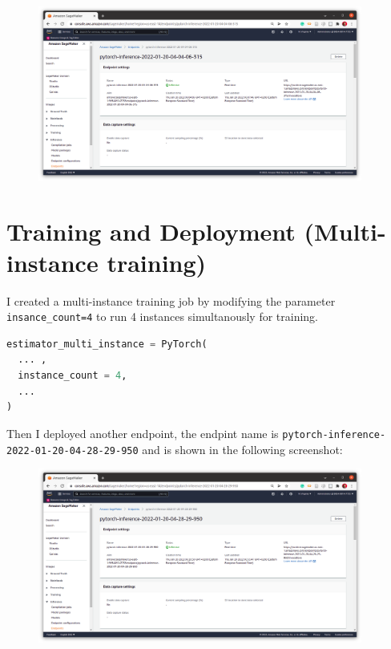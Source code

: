 \documentclass[a4paper
]{article}
\begin{document}
\begin{figure}[H]
\centering
\includegraphics[width=0.95\textwidth]{../screenshots/01-c_endpoint-1_single-instance-training.png}
\end{figure}

\hypertarget{training-and-deployment-multi-instance-training}{%
\section{Training and Deployment (Multi-instance
training)}\label{training-and-deployment-multi-instance-training}}

I created a multi-instance training job by modifying the parameter
\texttt{insance\_count=4} to run 4 instances simultanously for training.

\begin{lstlisting}[language=Python]
estimator_multi_instance = PyTorch(
  ... ,
  instance_count = 4,
  ...
)
\end{lstlisting}


Then I deployed another endpoint, the endpint name is
\texttt{\textquotesingle{}pytorch-inference-2022-01-20-04-28-29-950\textquotesingle{}}
and is shown in the following screenshot:

\begin{figure}[H]
\centering
\includegraphics[width=0.95\textwidth]{../screenshots/01-c_endpoint-2_multi-instance-training.png}
\end{figure}
\end{document}
